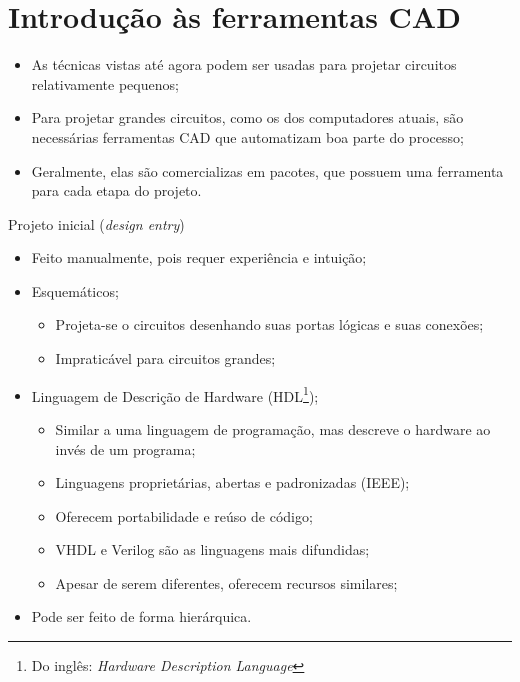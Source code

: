 

\subtitle{Introdução às ferramentas CAD} %



\begin{frame}
	\titlepage
\end{frame} 

\section{Introdução às ferramentas CAD}

\begin{frame}{\insertsection} %
	\begin{itemize}
		\item As técnicas vistas até agora podem ser usadas para projetar circuitos relativamente pequenos;
		\item Para projetar grandes circuitos, como os dos computadores atuais, são necessárias ferramentas CAD que automatizam boa parte do processo;
		\item Geralmente, elas são comercializas em pacotes, que possuem uma ferramenta para cada etapa do projeto. 
    \end{itemize}
\end{frame}

\begin{frame}{Projeto inicial (\textit{design entry})} %
	\begin{itemize}
		\item Feito manualmente, pois requer experiência e intuição; 
		\item Esquemáticos;
		\begin{itemize}
		    \item Projeta-se o circuitos desenhando suas portas lógicas e suas conexões; 
		    \item Impraticável para circuitos grandes; 
		\end{itemize}
		\item Linguagem de Descrição de Hardware (HDL\footnote{Do inglês: \textit{Hardware Description Language}});
		\begin{itemize}
		    \item Similar a uma linguagem de programação, mas descreve o hardware ao invés de um programa; 
		    \item Linguagens proprietárias, abertas e padronizadas (IEEE);
		    \item Oferecem portabilidade e reúso de código;
		    \item VHDL e Verilog são as linguagens mais difundidas; 
		    \item Apesar de serem diferentes, oferecem recursos similares;
		\end{itemize}
		\item Pode ser feito de forma hierárquica. 
    \end{itemize}
\end{frame}

